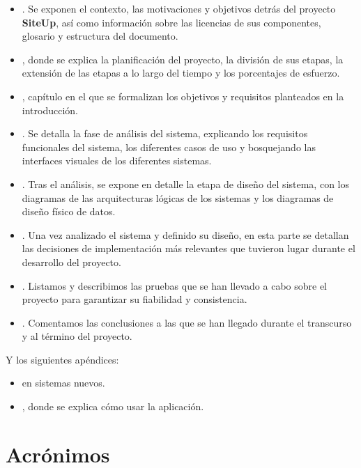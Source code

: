 \begin{itemize}
\item \textbf{}. Se exponen el contexto, las motivaciones y
  objetivos detrás del proyecto \textbf{SiteUp}, así como información sobre las
  licencias de sus componentes, glosario y estructura del documento.

\item \textbf{}, donde se explica la planificación del
  proyecto, la división de sus etapas, la extensión de las etapas a lo largo del
  tiempo y los porcentajes de esfuerzo.

\item \textbf{}, capítulo en el que se formalizan los
  objetivos y requisitos planteados en la introducción.

\item \textbf{}. Se detalla la fase de análisis del
  sistema, explicando los requisitos funcionales del sistema, los diferentes
  casos de uso y bosquejando las interfaces visuales de los diferentes sistemas.

\item \textbf{}. Tras el análisis, se expone en detalle
  la etapa de diseño del sistema, con los diagramas de las arquitecturas lógicas
  de los sistemas y los diagramas de diseño físico de datos.

\item \textbf{}. Una vez analizado el sistema y
  definido su diseño, en esta parte se detallan las decisiones de implementación
  más relevantes que tuvieron lugar durante el desarrollo del proyecto.

\item \textbf{}. Listamos y describimos las pruebas que se
  han llevado a cabo sobre el proyecto para garantizar su fiabilidad y
  consistencia.

\item \textbf{}. Comentamos las conclusiones a las
  que se han llegado durante el transcurso y al término del proyecto.
\end{itemize}

Y los siguientes apéndices:
\begin{itemize}
\item \textbf{} en sistemas nuevos.
\item \textbf{}, donde se explica cómo usar la aplicación.
\end{itemize}

\section{Acrónimos}




